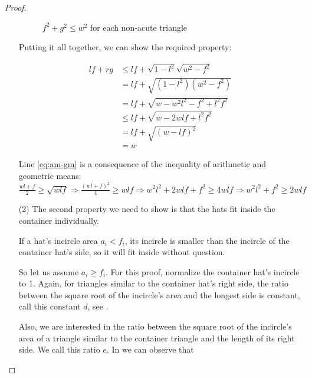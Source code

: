 \documentclass[%
    a4paper,              %
    style=screen,          %
    bibliography=totoc,   %
    nexus,                %
    lnum,                 %
    extramargin,          %
]{tubsbook}
\begin{document}
\begin{proof}
\begin{itemize}
\begin{figure}[htbp!]
                \caption{$f^2 + g^2 \le w^2$ for each non-acute triangle}
                \label{fig:hatsoverlap}
            \end{figure}

            Putting it all together, we can show the required property:

            \begin{align*}
                lf + rg
                &\le lf + \sqrt{1-l^2} \sqrt{w^2-f^2}\\
                &= lf + \sqrt{(1-l^2)(w^2-f^2)}\\
                &= lf + \sqrt{w - w^2l^2 - f^2 + l^2f^2}\\
                &\le lf + \sqrt{w - 2wlf + l^2f^2}\tag{\theequation}\label{eq:am-gm}\\
                &= lf + \sqrt{(w-lf)^2}\\
                &= w
            \end{align*}

            Line \ref{eq:am-gm} is a consequence of the inequality of arithmetic and geometric means: $\frac{wl+f}{2} \ge \sqrt{wlf} \Rightarrow \frac{(wl+f)^2}{4} \ge wlf \Rightarrow w^2l^2 + 2 wlf + f^2 \ge 4 wlf \Rightarrow w^2l^2 + f^2 \ge 2wlf$

        \item[(2)]
            The second property we need to show is that the hats fit inside the container individually.

            If a hat's incircle area $a_i < f_i$, its incircle is smaller than the incircle of the container hat's side, so it will fit inside without question.

            So let us assume $a_i \ge f_i$. For this proof, normalize the container hat's incircle to 1. Again, for triangles similar to the container hat's right side, the ratio between the square root of the incircle's area and the longest side is constant, call this constant $d$, see .

            Also, we are interested in the ratio between the square root of the incircle's area of a triangle similar to the container triangle and the length of its right side. We call this ratio $e$. In  we can observe that


\end{itemize}
\end{proof}
\end{document}
